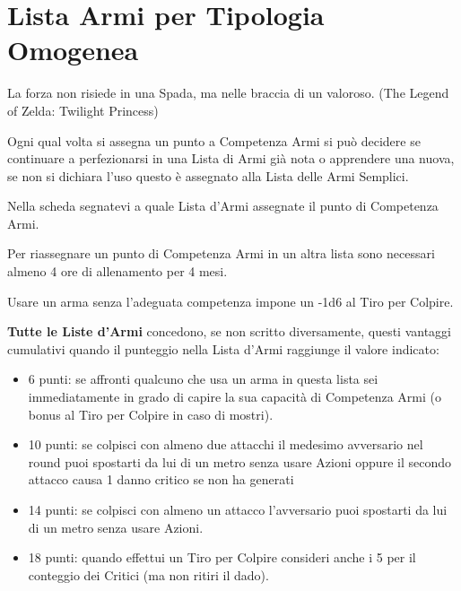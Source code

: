 \section{Lista Armi per Tipologia Omogenea}\hypertarget{lista.armi}{}\label{lista.armi}

\begin{enfasi}{La forza non risiede in una Spada, ma nelle braccia di un valoroso. (The Legend of Zelda: Twilight Princess)} \end{enfasi}

\begin{multicols}{2}

Ogni qual volta si assegna un punto a Competenza Armi si può decidere se continuare a perfezionarsi in una Lista di Armi già nota o apprendere una nuova, se non si dichiara l'uso questo è assegnato alla Lista delle Armi Semplici.

Nella scheda segnatevi a quale Lista d'Armi assegnate il punto di Competenza Armi.

Per riassegnare un punto di Competenza Armi in un altra lista sono necessari almeno 4 ore di allenamento per 4 mesi.

Usare un arma senza l'adeguata competenza impone un -1d6 al Tiro per Colpire.

\textbf{Tutte le Liste d'Armi} concedono, se non scritto diversamente, questi vantaggi cumulativi quando il punteggio nella Lista d'Armi raggiunge il valore indicato:

\begin{itemize}[leftmargin=*] \setlength{\itemsep}{0pt}

\item 6 punti: se affronti qualcuno che usa un arma in questa lista sei immediatamente in grado di capire la sua capacità di Competenza Armi (o bonus al Tiro per Colpire in caso di mostri).

\item 10 punti: se colpisci con almeno due attacchi il medesimo avversario nel round puoi spostarti da lui di un metro senza usare Azioni oppure il secondo attacco causa 1 danno critico se non ha generati

\item 14 punti: se colpisci con almeno un attacco l'avversario puoi spostarti da lui di un metro senza usare Azioni.

\item 18 punti: quando effettui un Tiro per Colpire consideri anche i 5 per il conteggio dei Critici (ma non ritiri il dado).


\end{itemize}
\end{multicols}
